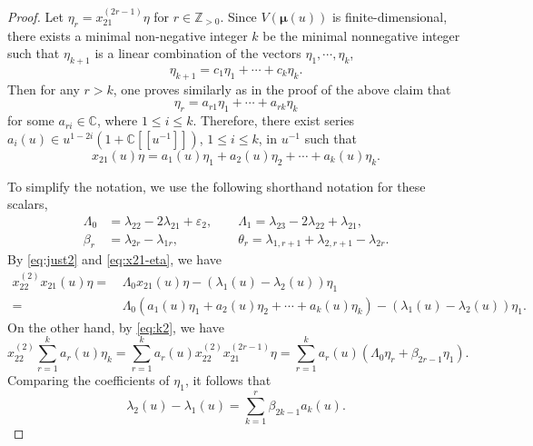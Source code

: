 \documentclass[11pt,reqno]{amsart}
\numberwithin{equation}{section}
\theoremstyle{definition}
\theoremstyle{remark}
\newcommand{\beq}{\begin{equation}}
\newcommand{\eeq}{\end{equation}}
\newcommand{\Z}{\mathbb{Z}}
\newcommand{\bC}{\mathbb{C}}
\newcommand{\lle}{\leqslant}
\newcommand{\la}{\lambda}
\newcommand{\La}{\Lambda}
\newcommand{\ve}{\varepsilon}
\begin{document}
\begin{proof}
Let $\eta_r=x_{21}^{(2r-1)}\eta$ for $r\in\Z_{>0}$. Since $V(\bm\mu(u))$ is finite-dimensional, there exists a minimal non-negative integer $k$ be the minimal nonnegative integer such that $\eta_{k+1}$ is a linear combination of the vectors $\eta_1,\cdots,\eta_k$,
\beq\label{eq:pf-low-0}
\eta_{k+1}=c_1\eta_1+\cdots+c_k\eta_k.
\eeq
Then for any $r>k$, one proves similarly as in the proof of the above claim that
\[
\eta_r=a_{r1}\eta_1+\cdots +a_{rk}\eta_k
\]
for some $a_{ri}\in \bC$, where $1\lle i\lle k$. Therefore, there exist series $a_i(u)\in u^{1-2i}(1+\bC[[u^{-1}]])$, $1\lle i\lle k$, in $u^{-1}$ such that
\beq\label{eq:x21-eta}
x_{21}(u)\eta=a_1(u)\eta_1+a_2(u)\eta_2+\cdots+a_k(u)\eta_k.
\eeq

To simplify the notation, we use the following shorthand notation for these scalars,
\begin{align*}
	\La_0&=\la_{22}-2\la_{21}+\ve_2,\qquad \La_1=\la_{23}-2\la_{22}+\la_{21},\\
	\beta_r&=\la_{2r}-\la_{1r},\qquad\qquad\ \ \  \theta_r=\la_{1,r+1}+\la_{2,r+1}-\la_{2r}.
\end{align*}
By \eqref{eq:just2} and \eqref{eq:x21-eta}, we have
\beq\label{eq:pf-low-1}
\begin{split}
	x_{22}^{(2)}x_{21}(u)\eta=&\,\La_0x_{21}(u)\eta-(\la_1(u)-\la_2(u))\eta_1\\
	=&\,\La_0(a_1(u)\eta_1+a_2(u)\eta_2+\cdots+a_k(u)\eta_k)-(\la_1(u)-\la_2(u))\eta_1.
\end{split}
\eeq
On the other hand, by \eqref{eq:k2}, we have
\beq\label{eq:pf-low-2}
	x_{22}^{(2)}\sum_{r=1}^k a_r(u)\eta_k= \sum_{r=1}^k a_r(u)x_{22}^{(2)}x_{21}^{(2r-1)}\eta	=\sum_{r=1}^k a_r(u)(\La_0\eta_r+\beta_{2r-1}\eta_1).
\eeq
Comparing the coefficients of $\eta_1$, it follows that
\beq\label{eq:pf-low-3}
\la_2(u)-\la_1(u)=\sum_{k=1}^r \beta_{2k-1}a_k(u).
\eeq


\end{proof}
\end{document}
